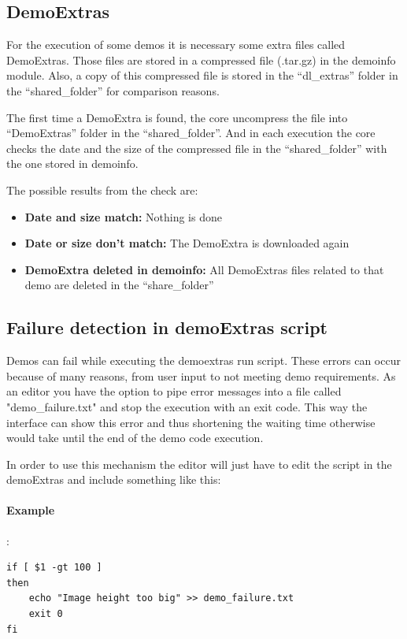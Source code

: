 \subsection{DemoExtras}

For the execution of some demos it is necessary some extra files called DemoExtras. Those files are stored in a compressed file (.tar.gz)
in the demoinfo module. Also, a copy of this compressed file is stored in the ``dl\_extras'' folder in the ``shared\_folder'' for comparison
reasons.

The first time a DemoExtra is found, the core uncompress the file into ``DemoExtras'' folder in the ``shared\_folder''. And in each execution
the core checks the date and the size of the compressed file in the ``shared\_folder'' with the one stored in demoinfo.

The possible results from the check are:
\begin{itemize}
 \item \textbf{Date and size match:} Nothing is done
 \item \textbf{Date or size don't match:} The DemoExtra is downloaded again
 \item \textbf{DemoExtra deleted in demoinfo:} All DemoExtras files related to that demo are deleted in the ``share\_folder''
\end{itemize}

\subsection{Failure detection in demoExtras script}

Demos can fail while executing the demoextras run script. These errors can occur because of many reasons, from user input to not meeting demo 
requirements. As an editor you have the option to pipe error messages into a file called "demo\_failure.txt" and stop the execution with an exit 
code. This way the interface can show this error and thus shortening the waiting time otherwise would take until the end of the demo code execution.

In order to use this mechanism the editor will just have to edit the script in the demoExtras and include something like this:
\paragraph{Example}:\\
\begin{verbatim}
if [ $1 -gt 100 ]
then
    echo "Image height too big" >> demo_failure.txt
    exit 0
fi
\end{verbatim} 